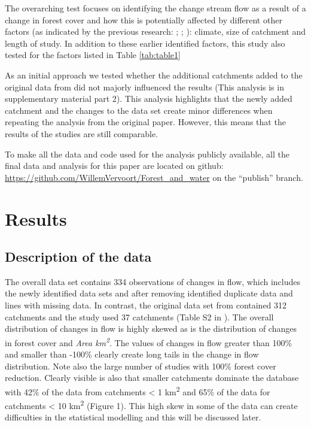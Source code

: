 \documentclass[]{elsarticle} %
\begin{document}
The overarching test focuses on identifying the change stream flow as a result of a change in forest cover and how this is potentially affected by different other factors (as indicated by the previous research: \citet{zhang2017}; \citet{filoso2017}; \citet{zhou2015}): climate, size of catchment and length of study. In addition to these earlier identified factors, this study also tested for the factors listed in Table \ref{tab:table1}

As an initial approach we tested whether the additional catchments added to the original data from \citet{zhang2017} did not majorly influenced the results (This analysis is in supplementary material part 2). This analysis highlights that the newly added catchment and the changes to the data set create minor differences when repeating the analysis from the original paper. However, this means that the results of the studies are still comparable.

To make all the data and code used for the analysis publicly available, all the final data and analysis for this paper are located on github:\\
\href{https://github.com/WillemVervoort/Forest_and_water/tree/publish}{https://github.com/WillemVervoort/Forest\_and\_water} on the ``publish'' branch.

\hypertarget{results}{%
\section{Results}\label{results}}

\hypertarget{description-of-the-data}{%
\subsection{Description of the data}\label{description-of-the-data}}

The overall data set contains 334 observations of changes in flow, which includes the newly identified data sets and after removing identified duplicate data and lines with missing data. In contrast, the original data set from \citet{zhang2017} contained 312 catchments and the \citet{filoso2017} study used 37 catchments (Table S2 in \citet{filoso2017}). The overall distribution of changes in flow is highly skewed as is the distribution of changes in forest cover and \emph{Area km\textsuperscript{2}}. The values of changes in flow greater than 100\% and smaller than -100\% clearly create long tails in the change in flow distribution. Note also the large number of studies with 100\% forest cover reduction. Clearly visible is also that smaller catchments dominate the database with 42\% of the data from catchments \textless{} 1 km\textsuperscript{2} and 65\% of the data for catchments \textless{} 10 km\textsuperscript{2} (Figure 1). This high skew in some of the data can create difficulties in the statistical modelling and this will be discussed later.
\end{document}
